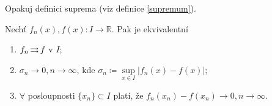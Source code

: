 \begin{poznamka}
  Opakuj definici suprema (viz definice \ref{supremum}).
\end{poznamka}

\begin{lemma}[$\sigma_n$]\label{16sigman}
  Nechť $f_n(x), f(x)\colon I \to \mathbb R$. Pak je ekvivalentní
  \begin{enumerate}[1.]
    \item $f_n \operatorname{\rightrightarrows} f$ v $I$;
    \item $\sigma_n \to 0, n \to \infty$, kde $\sigma_n \coloneq \sup\limits_{x \in I}|f_n(x)-f(x)|$;
    \item $\forall$ posloupnosti $\{x_n\}\subset I$ platí, že $f_n(x_n) - f(x_n) \to 0, n \to \infty$.
  \end{enumerate}
\end{lemma}

